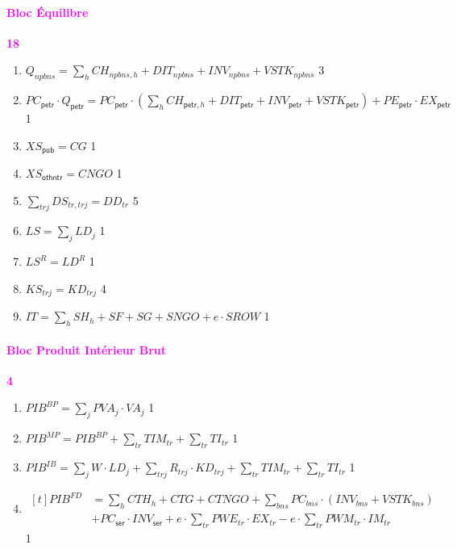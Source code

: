 \documentclass[11pt,a4paper]{article}
\newcommand{\bns}{\mathit{bns}}
\newcommand{\npbns}{\mathit{npbns}}
\newcommand{\othntr}{\mathsf{othntr}}
\newcommand{\petr}{\mathsf{petr}}
\newcommand{\pub}{\mathsf{pub}}
\newcommand{\ser}{\mathsf{ser}}
\newcommand{\tr}{\mathit{tr}}
\newcommand{\trj}{\mathit{trj}}
\newcommand{\CG}{\mathit{CG}}
\newcommand{\CH}{\mathit{CH}}
\newcommand{\CNGO}{\mathit{CNGO}}
\newcommand{\CTG}{\mathit{CTG}}
\newcommand{\CTH}{\mathit{CTH}}
\newcommand{\CTNGO}{\mathit{CTNGO}}
\newcommand{\DD}{\mathit{DD}}
\newcommand{\DIT}{\mathit{DIT}}
\newcommand{\DS}{\mathit{DS}}
\newcommand{\EX}{\mathit{EX}}
\newcommand{\IM}{\mathit{IM}}
\newcommand{\INV}{\mathit{INV}}
\newcommand{\IT}{\mathit{IT}}
\newcommand{\KD}{\mathit{KD}}
\newcommand{\KS}{\mathit{KS}}
\newcommand{\LD}{\mathit{LD}}
\newcommand{\LS}{\mathit{LS}}
\newcommand{\PC}{\mathit{PC}}
\newcommand{\PE}{\mathit{PE}}
\newcommand{\PIB}{\mathit{PIB}}
\newcommand{\PVA}{\mathit{PVA}}
\newcommand{\PWE}{\mathit{PWE}}
\newcommand{\PWM}{\mathit{PWM}}
\newcommand{\SF}{\mathit{SF}}
\newcommand{\SG}{\mathit{SG}}
\newcommand{\SH}{\mathit{SH}}
\newcommand{\SNGO}{\mathit{SNGO}}
\newcommand{\SROW}{\mathit{SROW}}
\newcommand{\TI}{\mathit{TI}}
\newcommand{\TIM}{\mathit{TIM}}
\newcommand{\VA}{\mathit{VA}}
\newcommand{\VSTK}{\mathit{VSTK}}
\newcommand{\XS}{\mathit{XS}}
\newcommand{\redparagraph}[1]{\paragraph*{\large\textcolor{Fuchsia}{#1}}}
\begin{document}
	\redparagraph{Bloc Équilibre}\hfill \textcolor{Fuchsia}{\textbf{18}} 
	\begin{enumerate}[itemsep=2pt,label=\textbf{eq\arabic*}.,resume,  ref=\textbf{eq\arabic*}]
		
		\item $Q_{\npbns} = \sum_{h} \CH_{\npbns,h} + \DIT_{\npbns} + \INV_{\npbns} +  \VSTK_{\npbns}$  \label{it:Qpetr}\hfill 3
		
		\item $ \PC_{\petr}\cdot Q_{\petr} = \PC_{\petr}\cdot\left(\sum_{h} \CH_{\petr,h} + \DIT_{\petr}  + \INV_{\petr} + \VSTK_{\petr}\right) + \PE_{\petr}\cdot\EX_{\petr}$  \label{it:QDpetr}\hfill 1
		
		\item $\XS_{\pub} = \CG$ \hfill 1
		
		\item $\XS_{\othntr} = \CNGO$ \hfill 1
		
		\item $\sum_{\trj}\DS_{\tr,\trj} = \DD_{\tr}$ \hfill 5
		
		\item $\LS = \sum_{j}\LD_j$ \label{it:LS}\hfill 1
		
		\item $\LS^R = \LD^R$ \label{it:LS_R}\hfill 1
				
		\item $\KS_{\trj} = \KD_{\trj}$ \label{it:KS}\hfill 4
		
		\item $\IT  = \sum_{h}\SH_h + \SF + \SG + \SNGO + e\cdot\SROW $  \label{it:IT}\hfill 1
		
	\end{enumerate}
	
	\redparagraph{Bloc Produit Intérieur Brut}\hfill \textcolor{Fuchsia}{\textbf{4}} 
	\begin{enumerate}[itemsep=2pt,label=\textbf{eq\arabic*}.,resume,  ref=\textbf{eq\arabic*}]
		
		\item $ \PIB^{\mathit{\mathit{BP}}} = \sum_{j} \PVA_{j}\cdot\VA_{j}$ \hfill 1 
		
		\item $ \PIB^{\mathit{MP}} =  \PIB^{\mathit{BP}} + \sum_{\tr} 	\TIM_{\tr} +\sum_{\tr} \TI_{\tr}$ \hfill 1 
		
		\item $ \PIB^{\mathit{IB}} =  \sum_{j} W\cdot\LD_{j} + \sum_{\trj} R_{\trj}\cdot\KD_{\trj} + \sum_{\tr} \TIM_{\tr} +\sum_{\tr} \TI_{\tr}$ \hfill 1 
		
		\item $\begin{aligned}[t]
			\PIB^{\mathit{FD}} &=  \sum_{h} \CTH_{h} + \CTG + \CTNGO +  \sum_{\bns}\PC_{\bns}\cdot\left(\INV_{\bns} + \VSTK_{\bns}\right)  \\
			&+ \PC_{\ser}\cdot\INV_{\ser} +   e\cdot\sum_{\tr}^{} \PWE_{\tr}\cdot\EX_{\tr} - e\cdot \sum_{\tr}^{} \PWM_{\tr}\cdot\IM_{\tr}
		\end{aligned}$   \hfill 1
		
	\end{enumerate}
	
\end{document}

